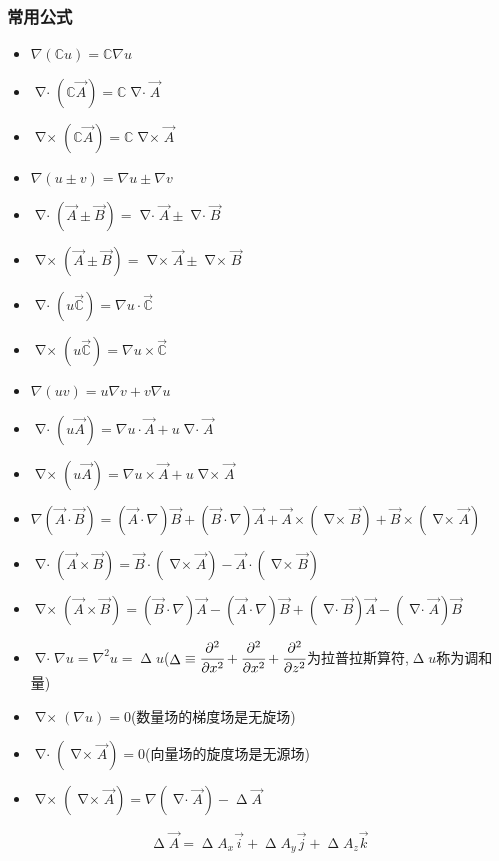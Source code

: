 \documentclass[UTF8,12pt]{ctexbook}
\newcommand{\mathConstant}{\mathbb{C}}
\DeclareMathOperator{\divergenceSymbol}{\nabla\cdot}
\DeclareMathOperator{\curlSymbol}{\nabla\times}
\DeclareMathOperator{\laplaceOperator}{\Delta}
\begin{document}
{{{{    \subsubsection{常用公式}{
      \begin{itemize}
        \item $\nabla(\mathConstant u) = \mathConstant \nabla u$
        \item $\divergenceSymbol(\mathConstant\vec{A}) = \mathConstant \divergenceSymbol \vec{A}$
        \item $\curlSymbol(\mathConstant \vec{A}) = \mathConstant \curlSymbol \vec{A}$
        \item $\nabla(u \pm v) = \nabla u \pm \nabla v$
        \item $\divergenceSymbol(\vec{A} \pm \vec{B}) = \divergenceSymbol \vec{A} \pm \divergenceSymbol \vec{B}$
        \item $\curlSymbol(\vec{A} \pm \vec{B}) = \curlSymbol\vec{A} \pm \curlSymbol\vec{B}$
        \item $\divergenceSymbol(u\vec{\mathConstant}) = \nabla u \cdot \vec{\mathConstant}$
        \item $\curlSymbol(u\vec{\mathConstant}) = \nabla u \times \vec{\mathConstant}$
        \item $\nabla(uv) = u\nabla v + v\nabla u$
        \item $\divergenceSymbol(u\vec{A}) = \nabla u \cdot \vec{A} + u \divergenceSymbol \vec{A}$
        \item $\curlSymbol(u\vec{A}) = \nabla u \times \vec{A} + u \curlSymbol \vec{A}$
        \item $\nabla(\vec{A} \cdot \vec{B}) = (\vec{A} \cdot \nabla)\vec{B} + (\vec{B} \cdot \nabla)\vec{A} + \vec{A}\times(\curlSymbol\vec{B}) + \vec{B}\times(\curlSymbol\vec{A})$
        \item $\divergenceSymbol(\vec{A}\times\vec{B}) = \vec{B}\cdot(\curlSymbol\vec{A}) - \vec{A}\cdot(\curlSymbol\vec{B})$
        \item $\curlSymbol(\vec{A} \times \vec{B}) = (\vec{B} \cdot \nabla)\vec{A} - (\vec{A} \cdot \nabla)\vec{B} + (\divergenceSymbol\vec{B})\vec{A} - (\divergenceSymbol\vec{A})\vec{B}$
        \item $\divergenceSymbol\nabla u = \nabla^2 u = \laplaceOperator u$($\laplaceOperator \equiv  \cfrac{\partial^2}{\partial x^2} + \cfrac{\partial^2}{\partial x^2} + \cfrac{\partial^2}{\partial z^2}$为拉普拉斯算符,$\laplaceOperator u$称为调和量)
        \item $\curlSymbol(\nabla u) = 0$(数量场的梯度场是无旋场)
        \item $\divergenceSymbol(\curlSymbol\vec{A}) = 0$(向量场的旋度场是无源场)
        \item $\curlSymbol(\curlSymbol\vec{A}) = \nabla(\divergenceSymbol\vec{A}) - \laplaceOperator\vec{A}$
      \end{itemize}
      $$
        \laplaceOperator \vec{A} = \laplaceOperator A_x\vec{i} + \laplaceOperator A_y\vec{j} + \laplaceOperator A_z\vec{k}
      $$
    }%

}}}}
\end{document}
